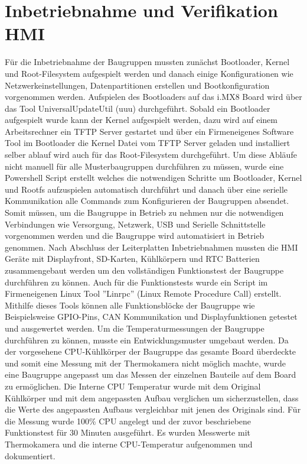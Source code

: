 \documentclass[praktikum,german]{hgbthesis}
\begin{document}
\section{Inbetriebnahme und Verifikation HMI}
Für die Inbetriebnahme der Baugruppen mussten zunächst Bootloader, Kernel und Root-Filesystem aufgespielt werden und danach einige Konfigurationen wie Netzwerkeinstellungen, Datenpartitionen erstellen und Bootkonfiguration vorgenommen werden. Aufspielen des Bootloaders auf das i.MX8 Board wird über das Tool UniversalUpdateUtil (uuu) durchgeführt. Sobald ein Bootloader aufgespielt wurde kann der Kernel aufgespielt werden, dazu wird auf einem Arbeitsrechner ein TFTP Server gestartet und über ein Firmeneigenes Software Tool im Bootloader die Kernel Datei vom TFTP Server geladen und installiert selber ablauf wird auch für das Root-Filesystem durchgeführt. Um diese Abläufe nicht manuell für alle Musterbaugruppen durchführen zu müssen, wurde eine Powershell Script erstellt welches die notwendigen Schritte um Bootloader, Kernel und Rootfs aufzuspielen automatisch durchführt und danach über eine serielle Kommunikation alle Commands zum Konfigurieren der Baugruppen absendet. Somit müssen, um die Baugruppe in Betrieb zu nehmen nur die notwendigen Verbindungen wie Versorgung, Netzwerk, USB und Serielle Schnittstelle vorgenommen werden und die Baugruppe wird automatisiert in Betrieb genommen. Nach Abschluss der Leiterplatten Inbetriebnahmen mussten die HMI Geräte mit Displayfront, SD-Karten, Kühlkörpern und RTC Batterien zusammengebaut werden um den vollständigen Funktionstest der Baugruppe durchführen zu können. Auch für die Funktionstests wurde ein Script im Firmeneigenen Linux Tool ''Linrpc'' (Linux Remote Procedure Call) erstellt. Mithilfe dieses Tools können alle Funktionsblöcke der Baugruppe wie Beispielsweise GPIO-Pins, CAN Kommunikation und Displayfunktionen getestet und ausgewertet werden. 
Um die Temperaturmessungen der Baugruppe durchführen zu können, musste ein Entwicklungsmuster umgebaut werden. Da der vorgesehene CPU-Kühlkörper der Baugruppe das gesamte Board überdeckte und somit eine Messung mit der Thermokamera nicht möglich machte, wurde eine Baugruppe angepasst um das Messen der einzelnen Bauteile auf dem Board zu ermöglichen. Die Interne CPU Temperatur wurde mit dem Original Kühlkörper und mit dem angepassten Aufbau verglichen um sicherzustellen, dass die Werte des angepassten Aufbaus vergleichbar mit jenen des Originals sind. Für die Messung wurde 100\% CPU angelegt und der zuvor beschriebene Funktionstest für 30 Minuten ausgeführt. Es wurden Messwerte mit Thermokamera und die interne CPU-Temperatur aufgenommen und dokumentiert.
\end{document}
